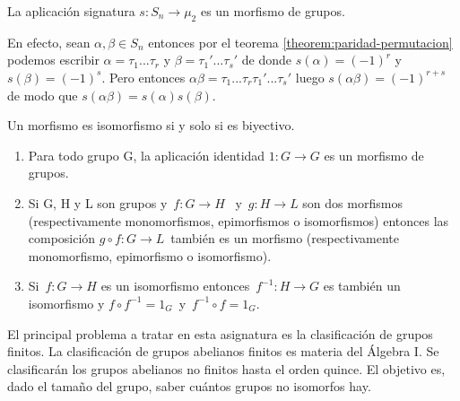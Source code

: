 \begin{ejemplo}
La aplicación signatura $s:S_n \rightarrow \mu_2$ es un morfismo de grupos.

En efecto, sean $\alpha,\beta \in S_n$ entonces por el teorema \ref{theorem:paridad-permutacion} podemos escribir $\alpha = \tau_1...\tau_r$ y $\beta = \tau_1'...\tau_s'$ de donde $s(\alpha) = (-1)^r$ y $s(\beta) = (-1)^s$. Pero entonces $\alpha\beta = \tau_1...\tau_r\tau_1'...\tau_s'$ luego $s(\alpha\beta) = (-1)^{r+s}$ de modo que $s(\alpha\beta) = s(\alpha)s(\beta)$.
\end{ejemplo}

\begin{nprop}
Un morfismo es isomorfismo si y solo si es biyectivo.
\end{nprop}

\begin{nprop}\hfill \begin{enumerate}
  \item Para todo grupo G, la aplicación identidad $1:G \to G$ es un morfismo de grupos.
  \item Si G, H y L son grupos y\, $f:G \rightarrow H$ \, y\, $g:H \rightarrow L$ son dos morfismos (respectivamente monomorfismos, epimorfismos o isomorfismos) entonces las composición $g \circ f:G \rightarrow L$\, también es un morfismo (respectivamente monomorfismo, epimorfismo o isomorfismo).
  \item Si \,$f:G \to H$ es un isomorfismo entonces \,$f^{-1}:H \to G$ es también un isomorfismo y $f \circ f^{-1} = 1_G$\, y \,$f^{-1} \circ f = 1_G$.
\end{enumerate}
\end{nprop}

El principal problema a tratar en esta asignatura es la clasificación de grupos finitos. La clasificación de grupos abelianos finitos es materia del Álgebra I. Se clasificarán los grupos abelianos no finitos hasta el orden quince. El objetivo es, dado el tamaño del grupo, saber cuántos grupos no isomorfos hay.

